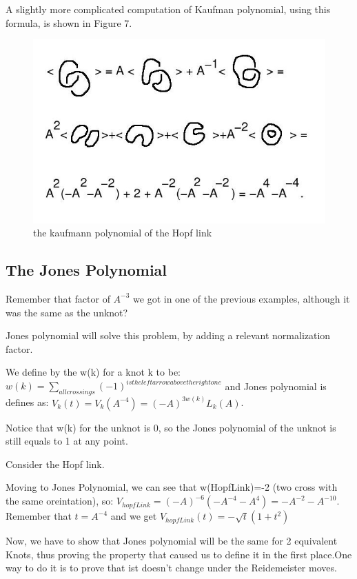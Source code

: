 \documentclass{article}
\begin{document}
A slightly more complicated computation of Kaufman polynomial, using this formula, is shown in Figure 7.
\begin{figure}
\includegraphics[scale=0.2]{hopf_link} 
\caption{the kaufmann polynomial of the Hopf link}
\end{figure}


\subsection{The Jones Polynomial}
Remember that factor of $A^{-3}$ we got in one of the previous examples, although it was the same as the unknot?

Jones polynomial will solve this problem, by adding a relevant normalization factor.

We define by the w(k) for a knot k to be: \(w(k) = \sum\limits_{all crossings}{(-1)^{is the left arrow above the right one}}\)
and Jones polynomial is defines as: \(V_{k}(t)=V_{k}(A^{-4})=(-A)^{3w(k)}L_{k}(A)\).

Notice that w(k) for the unknot is 0, so the Jones polynomial of the unknot is still equals to 1 at any point.

Consider the Hopf link.

Moving to Jones Polynomial, we can see that w(HopfLink)=-2 (two cross with the same oreintation), so:
\(V_{hopfLink}=(-A)^{-6}(-A^{-4}-A^{4}) = -A^{-2} - A^{-10}\).
Remember that \(t = A^{-4}\) and we get \(V_{hopfLink}(t)=-\sqrt{t}(1+t^{2})\)  

Now, we have to show that Jones polynomial will be the same for 2 equivalent Knots, thus proving the property that caused us to define it in the first place.One way to do it is to prove that ist doesn't change under the Reidemeister moves.
\end{document}
